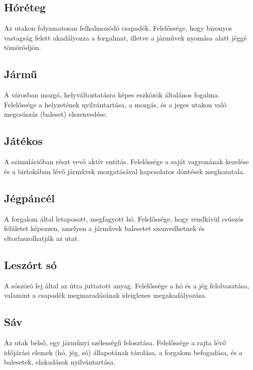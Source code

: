 \subsection{Hóréteg}
\par{Az utakon folyamatosan felhalmozódó csapadék. Felelőssége, hogy bizonyos vastagság felett akadályozza a forgalmat, illetve a járművek nyomása alatt jéggé tömörödjön.}

\subsection{Jármű}
\par{A városban mozgó, helyváltoztatásra képes eszközök általános fogalma. Felelőssége a helyzetének nyilvántartása, a mozgás, és a jeges utakon való megcsúszás (baleset) elszenvedése.}

\subsection{Játékos}
\par{A szimulációban részt vevő aktív entitás. Felelőssége a saját vagyonának kezelése és a birtokában lévő járművek mozgatásával kapcsolatos döntések meghozatala.}

\subsection{Jégpáncél}
\par{A forgalom által letaposott, megfagyott hó. Felelőssége, hogy rendkívül csúszós felületet képezzen, amelyen a járművek balesetet szenvedhetnek és eltorlaszolhatják az utat.}

\subsection{Leszórt só}
\par{A sószóró fej által az útra juttatott anyag. Felelőssége a hó és a jég felolvasztása, valamint a csapadék megmaradásának ideiglenes megakadályozása.}

\subsection{Sáv}
\par{Az utak belső, egy járműnyi szélességű felosztása. Felelőssége a rajta lévő időjárási elemek (hó, jég, só) állapotának tárolása, a forgalom befogadása, és a balesetek, elakadások nyilvántartása.}

